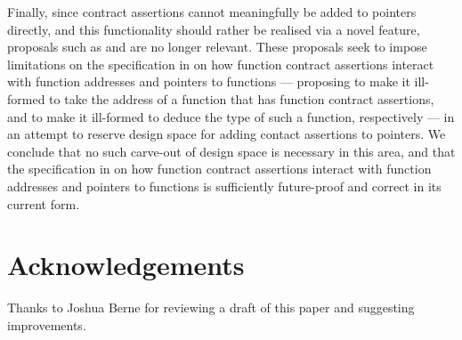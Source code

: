 Finally, since contract assertions cannot meaningfully be added to pointers directly, and this functionality should rather be realised via a novel feature, proposals such as \cite{P3221R0} and \cite{P3250R0} are no longer relevant. These proposals seek to impose limitations on the specification in \cite{P2900R7} on how function contract assertions interact with function addresses and pointers to functions --- proposing to make it ill-formed to take the address of a function that has function contract assertions, and to make it ill-formed to deduce the type of such a function, respectively --- in an attempt to reserve design space for adding  contact assertions to pointers. We conclude that no such carve-out of design space is necessary in this area, and that the specification in \cite{P2900R7} on how function contract assertions interact with function addresses and pointers to functions is sufficiently future-proof and correct in its current form.



\section*{Acknowledgements}
Thanks to Joshua Berne for reviewing a draft of this paper and suggesting improvements.




\renewcommand{\addcontentsline}[3]{}%







